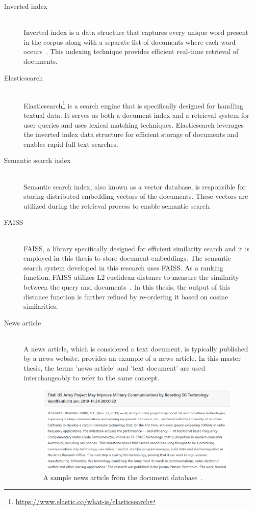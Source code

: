 \begin{description}
	\item[Inverted index] \hfill \\ Inverted index is a data structure that captures every unique word present in the corpus along with a separate list of documents where each word occurs~\cite{ziviani2000compression}. This indexing technique provides efficient real-time retrieval of documents.
	
	\item[Elasticsearch] \hfill \\ Elasticsearch\footnote{\url{https://www.elastic.co/what-is/elasticsearch}} is a search engine that is specifically designed for handling textual data. It serves as both a document index and a retrieval system for user queries and uses lexical matching techniques. Elasticsearch leverages the inverted index data structure for efficient storage of documents and enables rapid full-text searches.
	
	\item[Semantic search index] \hfill \\ Semantic search index, also known as a vector database, is responsible for storing distributed embedding vectors of the documents. These vectors are utilized during the retrieval process to enable semantic search.
	
	\item[FAISS] \hfill \\ \ac{FAISS}, a library specifically designed for efficient similarity search and it is employed in this thesis to store document embeddings. The semantic search system developed in this research uses \ac{FAISS}. As a ranking function, \ac{FAISS} utilizes L2 euclidean distance to measure the similarity between the query and documents~\cite{githubGitHubFacebookresearchfaiss}. In this thesis, the output of this distance function is further refined by re-ordering it based on cosine similarities.
	
	\item[News article] \hfill \\ A news article, which is considered a text document, is typically published by a news website.  provides an example of a news article. In this master thesis, the terms 'news article' and 'text document' are used interchangeably to refer to the same concept.
	
	\begin{figure}[h!]
		\centering
		\includegraphics[width=.8\textwidth]{images/mitera_screenshots/sample_news_article.PNG}
		\caption[News article example.]{A sample news article from the document database~\cite{sample_news_article}.\label{fig:sample_newsarticle}}
	\end{figure} 
	

\end{description}
